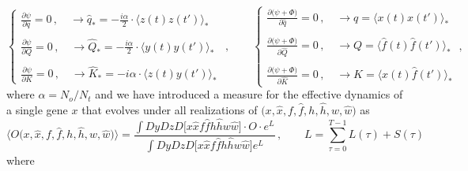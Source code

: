 \documentclass[%
 reprint,
superscriptaddress,
 amsmath,amssymb,
 prl,
]{revtex4-2}
\begin{document}
\begin{equation}
        \left \{ \begin{array}{l} \displaystyle \frac{\partial \psi}{\partial q} = 0\,,\quad \rightarrow \hat{q}_* = -\frac{i \alpha}{2}\cdot\langle z(t)z(t')\rangle_* \\ \\ \displaystyle \frac{\partial \psi}{\partial Q} = 0\,,\quad \rightarrow  \hat{Q}_* = -\frac{i\alpha }{2}\cdot \langle y(t)y(t')\rangle_*\\ \\ \displaystyle  \frac{\partial \psi}{\partial K} = 0\,,\quad  \rightarrow \hat{K}_* = -i\alpha\cdot \langle z(t)y(t') \rangle_*
     \end{array} \right.\, \,,\qquad 
\left \{ \begin{array}{l}  \displaystyle \frac{\partial (\psi + \Phi \big)}{\partial \hat{q}} = 0 \,,\quad \rightarrow  q = \big\langle  x(t) x(t') \big\rangle_* \\ \\\displaystyle \frac{\partial (\psi + \Phi \big)}{\partial \hat{Q}} = 0  \,,\quad  \rightarrow Q = \langle \hat{f}(t) \hat{f}(t')\rangle_*  \\ \\ \displaystyle \frac{\partial (\psi + \Phi \big)}{\partial \hat{K}} = 0  \,,\quad  \rightarrow K = \langle x(t)  \hat{f}(t') \rangle_*  \end{array} \right.\,,
\end{equation}
where $\alpha = N_o/N_t$ and we have   introduced a  measure for the effective dynamics of a single gene $x$ that evolves under all realizations of $\Big(x, \hat{x}, f, \hat{f}, h, \hat{h},   w, \hat{w} \Big)$ as
\begin{equation}
\Big\langle O\big(x, \hat{x}, f, \hat{f},h, \hat{h},w,\hat{w}\big) \Big\rangle = \frac{\displaystyle \int  Dy Dz D\big[x \hat{x} f \hat{f} h \hat{h} w \hat{w} \big]\cdot O \cdot e^{L}}{\displaystyle  \int   Dy Dz D\big[x \hat{x} f \hat{f}  h \hat{h} w \hat{w} \big] e^{L} } \,,\qquad L = \sum_{\tau =0}^{T-1} L(\tau) + S(\tau) 
\end{equation}
where
\end{document}
